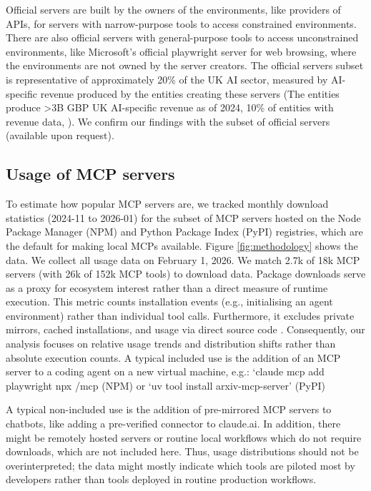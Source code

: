 \documentclass[manuscript,screen,nonacm,oneside]{acmart}
\begin{document}
Official servers are built by the owners of the environments, like providers of APIs, for servers with narrow-purpose tools to access constrained environments. There are also official servers with general-purpose tools to access unconstrained environments, like Microsoft's official playwright server for web browsing, where the environments are not owned by the server creators. The official servers subset is representative of approximately 20\% of the UK AI sector, measured by AI-specific revenue produced by the entities creating these servers (The entities produce \textgreater3B GBP UK AI-specific revenue as of 2024, 10\% of entities with revenue data, \citep{undefinedArtificialIntelligence}). We confirm our findings with the subset of official servers (available upon request).

\subsection{Usage of MCP servers}
\label{sec:usage-mcp}

To estimate how popular MCP servers are, we tracked monthly download statistics (2024-11 to 2026-01) for the subset of MCP servers hosted on the Node Package Manager (NPM) and Python Package Index (PyPI) registries, which are the default for making local MCPs available. Figure \ref{fig:methodology} shows the data. We collect all usage data on February 1, 2026. We match 2.7k of 18k MCP servers (with 26k of 152k MCP tools) to download data. Package downloads serve as a proxy for ecosystem interest rather than a direct measure of runtime execution. This metric counts installation events (e.g., initialising an agent environment) rather than individual tool calls. Furthermore, it excludes private mirrors, cached installations, and usage via direct source code \citep{npmjsBlogArchive}. Consequently, our analysis focuses on relative usage trends and distribution shifts rather than absolute execution counts. A typical included use is the addition of an MCP server to a coding agent on a new virtual machine, e.g.: `claude mcp add playwright npx \textquotesingle\@playwright/mcp\@latest\textquotesingle{} (NPM) or `uv tool install arxiv-mcp-server' (PyPI)

A typical non-included use is the addition of pre-mirrored MCP servers to chatbots, like adding a pre-verified connector to claude.ai. In addition, there might be remotely hosted servers or routine local workflows which do not require downloads, which are not included here. Thus, usage distributions should not be overinterpreted; the data might mostly indicate which tools are piloted most by developers rather than tools deployed in routine production workflows.
\end{document}
